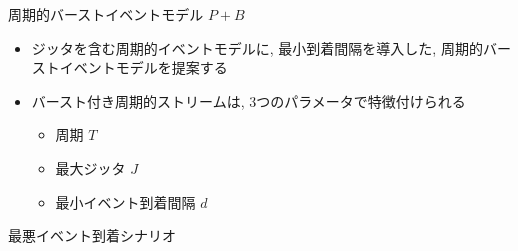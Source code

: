 \begin{frame}{周期的バーストイベントモデル $P+B$}
    \begin{itemize}
        \item ジッタを含む周期的イベントモデルに, 最小到着間隔を導入した, 周期的バーストイベントモデルを提案する
        \item バースト付き周期的ストリームは, 3つのパラメータで特徴付けられる
              \begin{itemize}
                  \item 周期 $T$
                  \item 最大ジッタ $J$
                  \item 最小イベント到着間隔 $d$
              \end{itemize}
    \end{itemize}
\end{frame}

\begin{frame}{最悪イベント到着シナリオ}
\end{frame}




